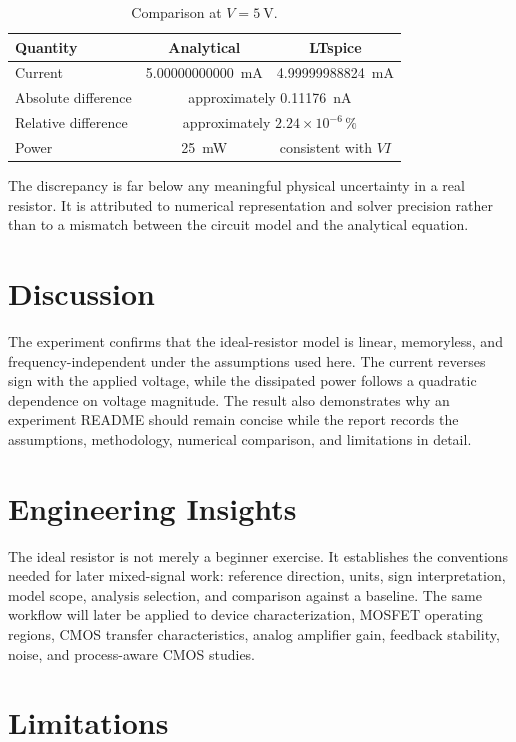 \documentclass[11pt,a4paper]{article}
\begin{document}
\begin{table}[htbp]
\centering
\caption{Comparison at $V=\SI{5}{\volt}$.}
\begin{tabular}{lcc}
\toprule
Quantity & Analytical & LTspice \\
\midrule
Current & \SI{5.00000000000}{\milli\ampere} & \SI{4.99999988824}{\milli\ampere} \\
Absolute difference & \multicolumn{2}{c}{approximately \SI{0.11176}{\nano\ampere}} \\
Relative difference & \multicolumn{2}{c}{approximately $2.24\times10^{-6}\,\%$} \\
Power & \SI{25}{\milli\watt} & consistent with $VI$ \\
\bottomrule
\end{tabular}
\end{table}

The discrepancy is far below any meaningful physical uncertainty in a real resistor. It is attributed to numerical representation and solver precision rather than to a mismatch between the circuit model and the analytical equation.

\section{Discussion}

The experiment confirms that the ideal-resistor model is linear, memoryless, and frequency-independent under the assumptions used here. The current reverses sign with the applied voltage, while the dissipated power follows a quadratic dependence on voltage magnitude. The result also demonstrates why an experiment README should remain concise while the report records the assumptions, methodology, numerical comparison, and limitations in detail.

\section{Engineering Insights}

The ideal resistor is not merely a beginner exercise. It establishes the conventions needed for later mixed-signal work: reference direction, units, sign interpretation, model scope, analysis selection, and comparison against a baseline. The same workflow will later be applied to device characterization, MOSFET operating regions, CMOS transfer characteristics, analog amplifier gain, feedback stability, noise, and process-aware CMOS studies.

\section{Limitations}
\end{document}
